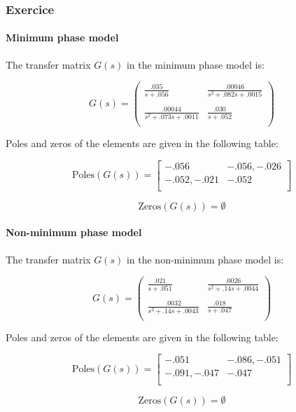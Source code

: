 \subsubsection{Exercice}
\paragraph{Minimum phase model}

The transfer matrix $G(s)$ in the minimum phase model is:

$$G(s) = \left(\begin{array}{cc} 
    \frac{.035}{s + .056} & \frac{.00046}{s^2 + .082 s + .0015} \\
    \\
    \frac{ .00044}{  s^2 + .073 s + .0011} & \frac{.030}{s + .052} \\
\end{array}\right)$$


Poles and zeros of the elements are given in the following table:

$$\text{Poles}(G(s)) = 
\left[\begin{array}{cc}
        -.056 & -.056, -.026 \\
        -.052,-.021 & -.052 \\
\end{array}\right]
$$

$$\text{Zeros}(G(s)) = \emptyset $$

\paragraph{Non-minimum phase model}

The transfer matrix $G(s)$ in the non-minimum phase model is:

$$G(s) = \left(\begin{array}{cc} 
    \frac{.021}{s + .051} & \frac{.0026}{s^2 + .14 s + .0044} \\
    \\
    \frac{ .0032}{ s^2 + .14 s + .0043} & \frac{.018}{s + .047} \\
\end{array}\right)$$

Poles and zeros of the elements are given in the following table:

$$\text{Poles}(G(s)) = 
\left[\begin{array}{cc}
        -.051 & -.086, -.051 \\
        -.091,-.047 & -.047 \\
\end{array}\right]
$$

$$\text{Zeros}(G(s)) = \emptyset $$
